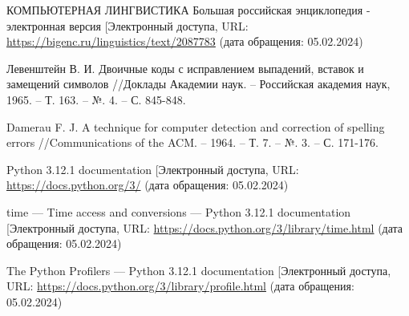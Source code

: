 \renewcommand\bibname{\centerline{СПИСОК ИСПОЛЬЗОВАННЫХ ИСТОЧНИКОВ}}

\begin{thebibliography}{3}
	\makeatletter
	\def\@biblabel#1{#1. }
	
	КОМПЬЮТЕРНАЯ ЛИНГВИСТИКА Большая российская энциклопедия - электронная версия [Электронный \text{ресурс]. -- Режим} доступа, URL: \url{https://bigenc.ru/linguistics/text/2087783} (дата обращения: 05.02.2024)
	
	Левенштейн В. И. Двоичные коды с исправлением выпадений, вставок и замещений символов //Доклады Академии наук. – Российская академия наук, 1965. – Т. 163. – №. 4. – С. 845-848.
	
	Damerau F. J. A technique for computer detection and correction of spelling errors //Communications of the ACM. – 1964. – Т. 7. – №. 3. – С. 171-176.
	
	Python 3.12.1 documentation [Электронный \text{ресурс]. -- Режим} доступа, URL: \url{https://docs.python.org/3/} (дата обращения: 05.02.2024)

	time — Time access and conversions — Python 3.12.1 documentation [Электронный \text{ресурс]. -- Режим} доступа, URL: \url{https://docs.python.org/3/library/time.html} (дата обращения: 05.02.2024)
	
	The Python Profilers — Python 3.12.1 documentation [Электронный \text{ресурс]. -- Режим} доступа, URL: \url{https://docs.python.org/3/library/profile.html} (дата обращения: 05.02.2024)
\end{thebibliography}